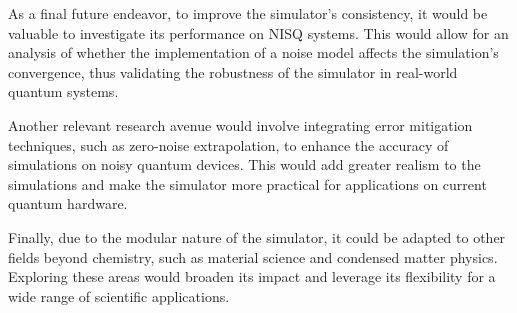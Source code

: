 As a final future endeavor, to improve the simulator's consistency, it would be valuable to investigate its performance on NISQ systems. This would allow for an analysis of whether the implementation of a noise model affects the simulation's convergence, thus validating the robustness of the simulator in real-world quantum systems.

Another relevant research avenue would involve integrating error mitigation techniques, such as zero-noise extrapolation, to enhance the accuracy of simulations on noisy quantum devices. This would add greater realism to the simulations and make the simulator more practical for applications on current quantum hardware.

Finally, due to the modular nature of the simulator, it could be adapted to other fields beyond chemistry, such as material science and condensed matter physics. Exploring these areas would broaden its impact and leverage its flexibility for a wide range of scientific applications.